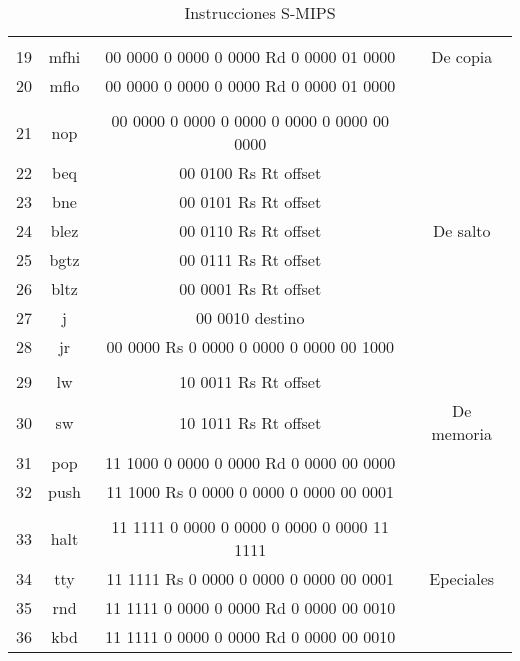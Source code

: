 \documentclass[12pt]{amsart}
\begin{document}
\begin{table}[t]
\begin{center}
\begin{tabular}{  | c | c | c | c | }
&&\\
19 & mfhi &			 00 0000 0 0000 0 0000 Rd 0 0000 01 0000 & De copia\\
20 & mflo &			 00 0000 0 0000 0 0000 Rd 0 0000 01 0000 &\\ \hline

&& &\\
21 & nop &				 00 0000 0 0000 0 0000 0 0000 0 0000 00 0000 &\\ 
22 &beq &			 	00 0100 Rs Rt offset &\\
23 & bne	&			 00 0101 Rs Rt offset &\\
24 & blez	&			 00 0110 Rs Rt offset & De salto\\
25 & bgtz	&			 00 0111 Rs Rt offset &\\
26 & bltz	&			 00 0001 Rs Rt offset &\\
27 &j		&			 00 0010 destino &\\
28 & jr	&			00 0000 Rs 0 0000 0 0000 0 0000 00 1000 &\\ \hline

&& &\\
29 &lw&				 10 0011 Rs Rt offset &\\
30 &sw&				10 1011 Rs Rt offset & De memoria\\
31 &pop&				11 1000 0 0000 0 0000 Rd 0 0000 00 0000 &\\
32 &push&				11 1000 Rs 0 0000 0 0000 0 0000 00 0001 &\\ \hline

&& &\\
33& halt &				11 1111 0 0000 0 0000 0 0000 0 0000 11 1111 &\\
34& tty&			           11 1111 Rs 0 0000 0 0000 0 0000 00 0001 & Epeciales\\
35& rnd&				11 1111 0 0000 0 0000 Rd 0 0000 00 0010 &\\
36&  kbd&				11 1111 0 0000 0 0000 Rd 0 0000 00 0010 &\\ \hline

\end{tabular} 

\caption{Instrucciones S-MIPS}
\end{center}
\end{table} 
	
	\bigskip\bigskip
	
	
	
\end{document}
